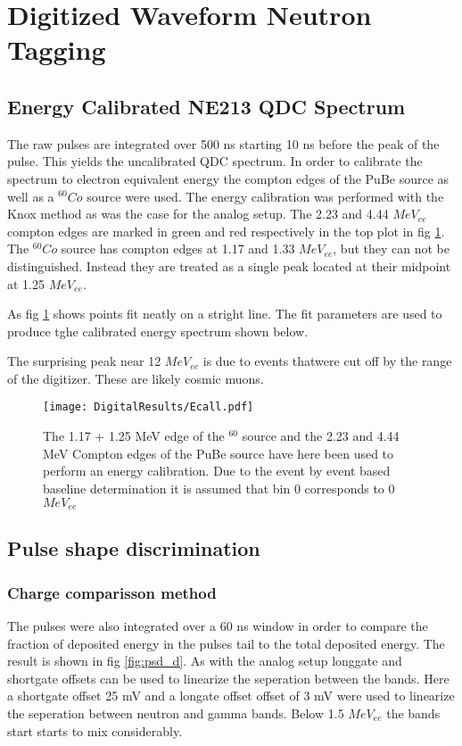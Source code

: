 \documentclass[main.tex]{subfiles}
\begin{document}
\section{Digitized Waveform Neutron Tagging}

\subsection{Energy Calibrated NE213 QDC Spectrum}
The raw pulses are integrated over 500 ns starting 10 ns before the peak of the pulse. This yields the uncalibrated QDC spectrum. In order to calibrate the spectrum to electron equivalent energy the compton edges of the PuBe source as well as a $^{60}Co$ source were used. The energy calibration was performed with the Knox method as was the case for the analog setup. The 2.23 and 4.44 $MeV_{ee}$ compton edges are marked in green and red respectively in the top plot in fig \ref{fig:D_QDC}. The $^{60}Co$ source has compton edges at 1.17 and 1.33 $MeV_{ee}$, but they can not be distinguished. Instead they are treated as a single peak located at their midpoint at 1.25 $MeV_{ee}$. 

As fig \ref{fig:D_QDC} shows points fit neatly on a stright line. The fit parameters are used to produce tghe calibrated energy spectrum shown below.

The surprising peak near 12 $MeV_{ee}$ is due to events thatwere cut off by the range of the digitizer. These are likely cosmic muons.
\begin{figure}[ht]
    \centering
        \texttt{[image: DigitalResults/Ecall.pdf]}
        \caption{The 1.17 + 1.25 MeV edge of the $^60$ source and the 2.23 and 4.44 MeV Compton edges of the PuBe source have here been used to perform an energy calibration. Due to the event by event based baseline determination it is assumed that bin 0 corresponds to 0 $MeV_{ee}$}
    \label{fig:D_QDC}
\end{figure}



\subsection{Pulse shape discrimination}
\subsubsection{Charge comparisson method}
The pulses were also integrated over a 60 ns window in order to compare the fraction of deposited energy in the pulses tail to the total deposited energy. The result is shown in fig \ref{fig:psd_d}. As with the analog setup longgate and shortgate offsets can be used to linearize the seperation between the bands. Here a shortgate offset 25 mV and a longate offset offset of 3 mV were used to linearize the seperation between neutron and gamma bands. Below 1.5 $MeV_{ee}$ the bands start starts to mix considerably.
\end{document}
